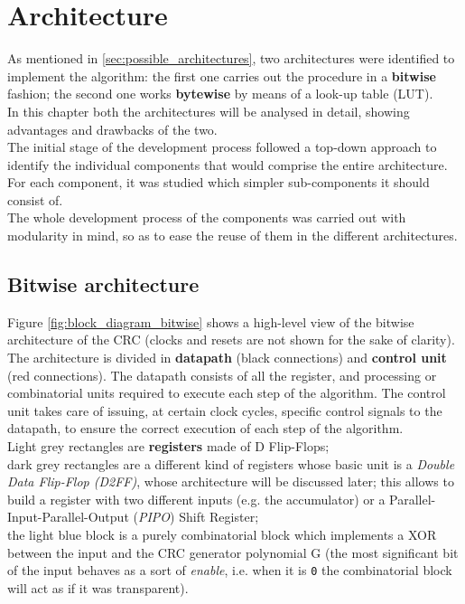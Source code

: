 %
\chapter{Architecture}\label{ch:architecture}

As mentioned in \ref{sec:possible_architectures}, two architectures were identified to implement the algorithm: the first one carries out the procedure in a \textbf{bitwise} fashion; the second one works \textbf{bytewise} by means of a look-up table (LUT).\\
In this chapter both the architectures will be analysed in detail, showing advantages and drawbacks of the two.\\
The initial stage of the development process followed a top-down approach to identify the individual components that would comprise the entire architecture. For each component, it was studied which simpler sub-components it should consist of.\\
The whole development process of the components was carried out with modularity in mind, so as to ease the reuse of them in the different architectures.\\

\section{Bitwise architecture}\label{sec:bitwise_arch}

Figure \ref{fig:block_diagram_bitwise} shows a high-level view of the bitwise architecture of the CRC (clocks and resets are not shown for the sake of clarity).\\
The architecture is divided in \textbf{datapath} (black connections) and \textbf{control unit} (red connections). The datapath consists of all the register, and processing or combinatorial units required to execute each step of the algorithm. The control unit takes care of issuing, at certain clock cycles, specific control signals to the datapath, to ensure the correct execution of each step of the algorithm.\\
\hfill \break
Light grey rectangles are \textbf{registers} made of D Flip-Flops;\\
dark grey rectangles are a different kind of registers whose basic unit is a \textit{Double Data Flip-Flop (D2FF)}, whose architecture will be discussed later; this allows to build a register with two different inputs (e.g. the accumulator) or a Parallel-Input-Parallel-Output (\textit{PIPO}) Shift Register;\\
the light blue block is a purely combinatorial block which implements a XOR between the input and the CRC generator polynomial G (the most significant bit of the input behaves as a sort of \textit{enable}, i.e. when it is \texttt{0} the combinatorial block will act as if it was transparent).\\

